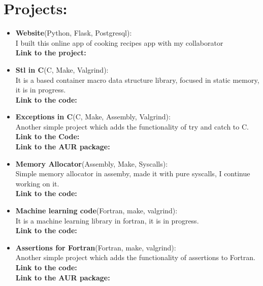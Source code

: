 \documentclass{article}
\begin{document}
\begin{minipage}[t]{8cm}
  \vspace*{-2cm}
  
\section*{Projects:}
\begin{itemize}
  \setlength\itemsep{0.01cm}
\item \textbf{Website}(Python, Flask, Postgresql):\\
  I built this online app of cooking recipes app with my collaborator
  \href{https://github.com/Experthor}{\color{blue}{Experthor}}\\
  \textbf{Link to the project:} \href{https://github.com/alecksandr26/recipe-app-web}{\color{Blue}{Github}}
\item \textbf{Stl in C}(C, Make, Valgrind):\\
  It is a based container macro data structure library, focused in static memory, it is in progress.\\
  \textbf{Link to the code:} \href{https://github.com/alecksandr26/sniffer}{\color{Blue}{GitHub}}
\item \textbf{Exceptions in C}(C, Make, Assembly, Valgrind): \\
  Another simple project which adds the functionality of try and catch to C.\\
  \textbf{Link to the Code:} \href{https://github.com/alecksandr26/c-exceptions}{\color{Blue}{GitHub}}\\
  \textbf{Link to the AUR package:} \href{https://aur.archlinux.org/packages/c-exceptions}{\color{Blue}{AUR}}
\item \textbf{Memory Allocator}(Assembly, Make, Syscalls):\\
  Simple memory allocator in assemby, made it with pure syscalls, I continue working on it.\\
  \textbf{Link to the code:} \href{https://github.com/alecksandr26/memory-allocator}{\color{Blue}{GitHub}}
\item \textbf{Machine learning code}(Fortran, make, valgrind):\\
  It is a machine learning library in fortran, it is in progress.\\
  \textbf{Link to the code:} \href{https://github.com/alecksandr26/machine-learning-code}{\color{Blue}{GitHub}}
\item \textbf{Assertions for Fortran}(Fortran, make, valgrind):\\
  Another simple project which adds the functionality of assertions to Fortran.\\
  \textbf{Link to the code:} \href{https://github.com/alecksandr26/assert-fortran}{\color{Blue}{GitHub}}\\
  \textbf{Link to the AUR package:}
  \href{https://aur.archlinux.org/packages/assert-fortran-git}{\color{Blue}{AUR}}
\end{itemize}


\end{minipage}
\end{document}
